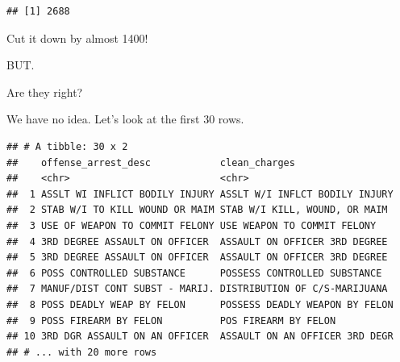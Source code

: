 \documentclass[]{book}
\newenvironment{Shaded}{\begin{snugshade}}{\end{snugshade}}
\newcommand{\DataTypeTok}[1]{\textcolor[rgb]{0.13,0.29,0.53}{#1}}
\newcommand{\DecValTok}[1]{\textcolor[rgb]{0.00,0.00,0.81}{#1}}
\newcommand{\KeywordTok}[1]{\textcolor[rgb]{0.13,0.29,0.53}{\textbf{#1}}}
\newcommand{\NormalTok}[1]{#1}
\newcommand{\OperatorTok}[1]{\textcolor[rgb]{0.81,0.36,0.00}{\textbf{#1}}}
\newcommand{\OtherTok}[1]{\textcolor[rgb]{0.56,0.35,0.01}{#1}}
\newcommand{\StringTok}[1]{\textcolor[rgb]{0.31,0.60,0.02}{#1}}
\begin{document}
\begin{Shaded}
\end{Shaded}

\begin{verbatim}
## [1] 2688
\end{verbatim}

Cut it down by almost 1400!

BUT.

Are they right?

We have no idea. Let's look at the first 30 rows.

\begin{Shaded}
\end{Shaded}

\begin{verbatim}
## # A tibble: 30 x 2
##    offense_arrest_desc            clean_charges                 
##    <chr>                          <chr>                         
##  1 ASSLT WI INFLICT BODILY INJURY ASSLT W/I INFLCT BODILY INJURY
##  2 STAB W/I TO KILL WOUND OR MAIM STAB W/I KILL, WOUND, OR MAIM 
##  3 USE OF WEAPON TO COMMIT FELONY USE WEAPON TO COMMIT FELONY   
##  4 3RD DEGREE ASSAULT ON OFFICER  ASSAULT ON OFFICER 3RD DEGREE 
##  5 3RD DEGREE ASSAULT ON OFFICER  ASSAULT ON OFFICER 3RD DEGREE 
##  6 POSS CONTROLLED SUBSTANCE      POSSESS CONTROLLED SUBSTANCE  
##  7 MANUF/DIST CONT SUBST - MARIJ. DISTRIBUTION OF C/S-MARIJUANA 
##  8 POSS DEADLY WEAP BY FELON      POSSESS DEADLY WEAPON BY FELON
##  9 POSS FIREARM BY FELON          POS FIREARM BY FELON          
## 10 3RD DGR ASSAULT ON AN OFFICER  ASSAULT ON AN OFFICER 3RD DEGR
## # ... with 20 more rows
\end{verbatim}
\end{document}
